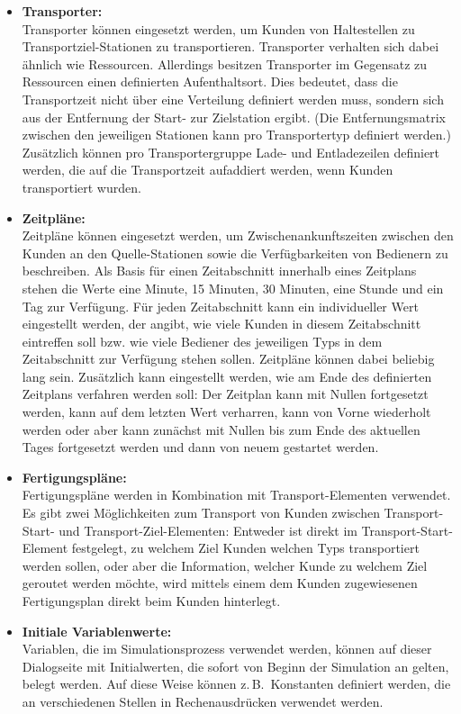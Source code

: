 \documentclass[deutsch]{svmono}
\begin{document}
\begin{itemize}
\item
\textbf{Transporter:}\\
Transporter können eingesetzt werden, um Kunden von Haltestellen zu Transportziel-Stationen zu transportieren. Transporter verhalten sich dabei ähnlich wie Ressourcen. Allerdings besitzen Transporter im Gegensatz zu Ressourcen einen definierten Aufenthaltsort. Dies bedeutet, dass die Transportzeit nicht über eine Verteilung definiert werden muss, sondern sich aus der Entfernung der Start- zur Zielstation ergibt. (Die Entfernungsmatrix zwischen den jeweiligen Stationen kann pro Transportertyp definiert werden.) Zusätzlich können pro Transportergruppe Lade- und Entladezeilen
definiert werden, die auf die Transportzeit aufaddiert werden, wenn Kunden transportiert wurden.
\item
\textbf{Zeitpläne:}\\
Zeitpläne können eingesetzt werden, um Zwischenankunftszeiten zwischen den Kunden an den Quelle-Stationen sowie die Verfügbarkeiten von Bedienern zu beschreiben. Als Basis für einen Zeitabschnitt innerhalb eines Zeitplans stehen die Werte eine Minute, 15 Minuten, 30 Minuten, eine Stunde und ein Tag zur Verfügung. Für jeden Zeitabschnitt kann ein individueller Wert eingestellt werden, der angibt, wie viele Kunden in diesem Zeitabschnitt eintreffen soll bzw. wie viele Bediener des jeweiligen Typs in dem Zeitabschnitt zur Verfügung stehen sollen. Zeitpläne können dabei beliebig lang sein. Zusätzlich kann eingestellt werden, wie am Ende des definierten Zeitplans verfahren werden soll: Der Zeitplan kann mit Nullen fortgesetzt werden, kann auf dem letzten Wert verharren, kann von Vorne wiederholt werden oder aber kann zunächst mit Nullen bis zum Ende des aktuellen Tages fortgesetzt werden und dann von neuem gestartet werden.
\item
\textbf{Fertigungspläne:}\\
Fertigungspläne werden in Kombination mit Transport-Elementen verwendet. Es gibt zwei Möglichkeiten zum Transport von Kunden zwischen Transport-Start- und Transport-Ziel-Elementen: Entweder ist direkt im Transport-Start-Element festgelegt, zu welchem Ziel Kunden welchen Typs transportiert werden sollen, oder aber die Information, welcher Kunde zu welchem Ziel geroutet werden möchte, wird mittels einem dem Kunden zugewiesenen Fertigungsplan direkt beim Kunden hinterlegt.
\item
\textbf{Initiale Variablenwerte:}\\
Variablen, die im Simulationsprozess verwendet werden, können auf dieser Dialogseite mit Initialwerten, die sofort von Beginn der Simulation an gelten, belegt werden. Auf diese Weise können z.\,B.\ Konstanten definiert werden, die an verschiedenen Stellen in Rechenausdrücken verwendet werden.

\end{itemize}
\end{document}
